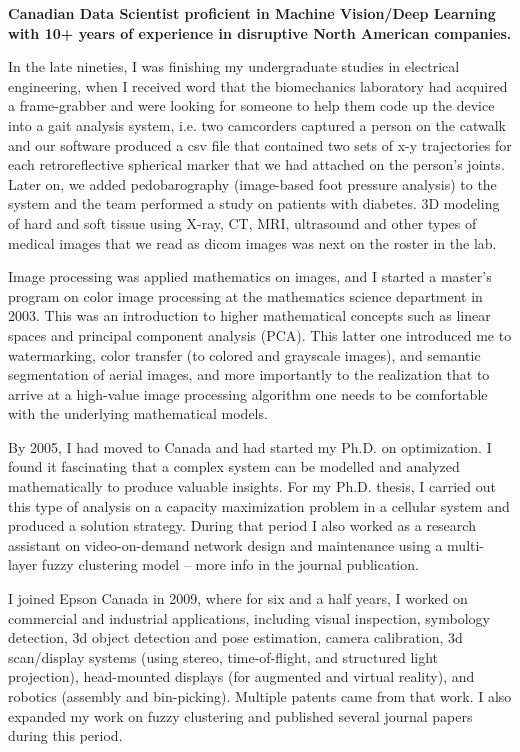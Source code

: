 \onehalfspace
\textbf{\large Canadian Data Scientist proficient in Machine Vision/Deep Learning with 10+ years of experience in 
disruptive North American companies.}
\singlespace

\vspace{0.8cm}

In the late nineties, I was finishing my undergraduate studies in electrical engineering, when I received word that the biomechanics laboratory had acquired a frame-grabber and were looking for someone to help them code up the device into a gait analysis system, i.e. two camcorders captured a person on the catwalk and our software produced a csv file that contained two sets of x-y trajectories for each retroreflective spherical marker that we had attached on the person's joints. Later on, we added pedobarography (image-based foot pressure analysis) to the system and the team performed a study on patients with diabetes. 3D modeling of hard and soft tissue using X-ray, CT, MRI, ultrasound and other types of medical images that we read as dicom images was next on the roster in the lab.

\newcommand{\osspacing}{\vspace{0.5cm}}

\osspacing
Image processing was applied mathematics on images, and I started a master's program on color image processing at the mathematics science department in 2003. This was an introduction to higher mathematical concepts such as linear spaces and principal component analysis (PCA). This latter one introduced me to watermarking, color transfer (to colored and grayscale images), and semantic segmentation of aerial images, and more importantly to the realization that to arrive at a high-value image processing algorithm one needs to be comfortable with the underlying mathematical models. 

\osspacing
By 2005, I had moved to Canada and had started my Ph.D. on optimization. I found it fascinating that a complex system can be modelled and analyzed mathematically to produce valuable insights. For my Ph.D. thesis, I carried out this type of analysis on a capacity maximization problem in a cellular system and produced a solution strategy. During that period I also worked as a research assistant on video-on-demand network design and maintenance using a multi-layer fuzzy clustering model -- more info in the journal publication.

\osspacing
I joined Epson Canada in 2009, where for six and a half years, I worked on commercial and industrial applications, including visual inspection, symbology detection, 3d object detection and pose estimation, camera calibration, 3d scan/display systems (using stereo, time-of-flight, and structured light projection), head-mounted displays (for augmented and virtual reality), and robotics (assembly and bin-picking). Multiple patents came from that work. I also expanded my work on fuzzy clustering and published several journal papers during this period.

